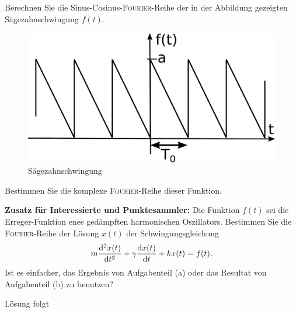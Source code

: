 \documentclass{atistandalonetask}
\begin{document}
  \begin{atiTask}[
    title = Sägezahnschwingung
  ]


	\begin{atiSubtasks}
		\item Berechnen Sie die Sinus-Cosinus-\textsc{Fourier}-Reihe der in der Abbildung gezeigten Sägezahnschwingung $f(t)$.
		\begin{figure}[H]
			\centering
			\includegraphics[width=0.7\linewidth]{picture-fourier_vVersion2}
			\caption{Sägezahnschwingung}
			\end{figure}
		\item Bestimmen Sie die komplexe \textsc{Fourier}-Reihe dieser Funktion.
		\item \textbf{Zusatz für Interessierte und Punktesammler:} Die Funktion $f(t)$ sei die Erreger-Funktion enes gedämpften harmonischen Oszillators. Bestimmen Sie die \textsc{Fourier}-Reihe der Lösung $x(t)$ der Schwingungsgleichung
			\[
			m\leibnizDerivative[2]{x(t)}{t}+\gamma \leibnizDerivative{x(t)}{t}+kx(t)=f(t).
			\]	
		Ist es einfacher, das Ergebnis von Aufgabenteil (a) oder das Resultat von Aufgabenteil (b) zu benutzen?	
	\end{atiSubtasks} 
  \end{atiTask}
  \begin{atiSolution}
   Lösung folgt
  \end{atiSolution}
\end{document}
